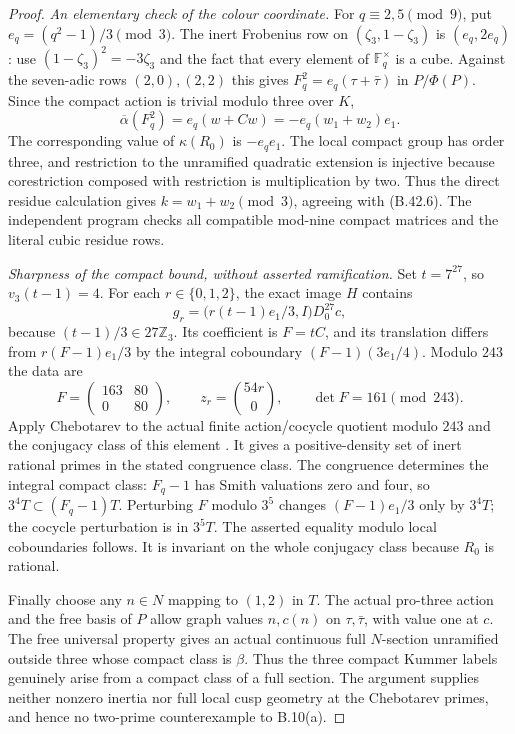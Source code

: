 \begin{proof}
\emph{An elementary check of the colour coordinate.}
For $q\equiv2,5\pmod9$, put $e_q=(q^2-1)/3\pmod3$.
The inert Frobenius row on $(\zeta_3,1-\zeta_3)$ is
$(e_q,2e_q)$: use $(1-\zeta_3)^2=-3\zeta_3$ and the fact
that every element of $\mathbb F_q^\times$ is a cube.
Against the seven-adic rows $(2,0),(2,2)$ this gives
$F_q^2=e_q(\tau+\bar\tau)$ in $P/\Phi(P)$.
Since the compact action is trivial modulo three over $K$,
\[
 \overline\alpha(F_q^2)=e_q(w+Cw)
                     =-e_q(w_1+w_2)e_1.
\]
The corresponding value of $\kappa(R_0)$ is $-e_qe_1$.
The local compact group has order three, and restriction to the
unramified quadratic extension is injective because corestriction
composed with restriction is multiplication by two.  Thus the
direct residue calculation gives $k=w_1+w_2\pmod3$, agreeing
with (B.42.6).  The independent program
 checks all compatible mod-nine
compact matrices and the literal cubic residue rows.

\emph{Sharpness of the compact bound, without asserted ramification.}
Set $t=7^{27}$, so $v_3(t-1)=4$.  For each $r\in\{0,1,2\}$,
the exact image $H$ contains
\[
       g_r=\bigl(r(t-1)e_1/3,I\bigr)D_0^{27}c,
\]
because $(t-1)/3\in27\mathbb Z_3$.  Its coefficient is $F=tC$,
and its translation differs from $r(F-1)e_1/3$ by the integral
coboundary $(F-1)(3e_1/4)$.  Modulo $243$ the data are
\[
 F=\begin{pmatrix}163&80\\0&80\end{pmatrix},\qquad
 z_r=\binom{54r}{0},\qquad \det F=161\pmod{243}.
                                                               \tag{B.42.10}
\]
Apply Chebotarev to the actual finite action/cocycle quotient
modulo $243$ and the conjugacy class of this element
\citep[V, Theorem 3.23; VIII, Theorem 7.4]{BMilneCFT2020}.
It gives a positive-density set of inert rational primes in the
stated congruence class.  The congruence determines the integral
compact class: $F_q-1$ has Smith valuations zero and four, so
$3^4T\subset(F_q-1)T$.  Perturbing $F$ modulo $3^5$ changes
$(F-1)e_1/3$ only by $3^4T$; the cocycle perturbation is in
$3^5T$.  The asserted equality modulo local coboundaries follows.
It is invariant on the whole conjugacy class because $R_0$ is
rational.

Finally choose any $n\in N$ mapping to $(1,2)$ in $T$.
The actual pro-three action and the free basis of $P$ allow graph
values $n,c(n)$ on $\tau,\bar\tau$, with value one at $c$.
The free universal property gives an actual continuous full
$N$-section unramified outside three whose compact class is
$\beta$.  Thus the three compact Kummer labels genuinely arise
from a compact class of a full section.  The argument supplies
neither nonzero inertia nor full local cusp geometry at the
Chebotarev primes, and hence no two-prime counterexample to B.10(a).


\end{proof}
